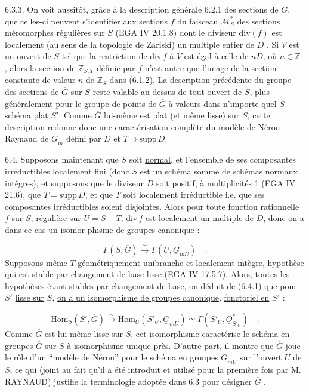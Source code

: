 6.3.3.  On voit aussitôt, grâce à la description générale 6.2.1 des sections de $\overline{G}$, que celles-ci peuvent s'identifier aux sections $f$ du faisceau $\mathcal{M}^*_S$ des sections méromorphes régulières sur $S$ (EGA IV 20.1.8) dont le diviseur $\mathrm{div}(f)$ est localement (au sens de la topologie de Zariski) un multiple entier de $D$ . Si $V$ est un ouvert de $S$ tel que la restriction de $\mathrm{div}\, f$ à $V$ est égal à celle de $nD$, où $n \in \mathbb{Z}$ , alors la section de $\mathbb{Z}_{S,T}$ définie par $f$ n'est autre que l'image de la section constante de valeur $n$ de $\mathbb{Z}_S$ dans (6.1.2). La description précédente du groupe des sections de $\overline{G}$ sur $S$ reste valable au-dessus de tout ouvert de $S$, plus généralement pour le groupe de points de $\overline{G}$ à valeurs dans n'importe quel $S$-schéma plat $S'$. Comme $\overline{G}$ lui-même est plat (et même lisse) sur $S$, cette description redonne donc une caractérisation complète du modèle de Néron-Raynaud de $\underline{G}_m$ défini par $D$ et $T \supset \mathrm{supp}\, D$.

6.4.  Supposons maintenant que $S$ soit \underline{normal}, et l'ensemble de ses composantes irréductibles localement fini (donc $S$ est un schéma somme de schémas normaux intègres), et supposons que le diviseur $D$ soit positif, à multiplicités 1 (EGA IV 21.6), que $T=\mathrm{supp}\, D$, et que $T$ soit localement irréductible i.e. que ses composantes irréductibles soient disjointes. Alors pour toute fonction rationnelle $f$ sur $S$, régulière sur $U = S-T$, $\mathrm{div}\, f$ est localement un multiple de $D$, donc on a dans ce cas un isomor
phisme de groupes canonique :

\begin{equation}\tag{6.4.1}
\Gamma(S,\overline{G}) \overset{\sim}{\longrightarrow} \Gamma(U,\underline{G}_{mU}) \quad .
\end{equation}
Supposons même $T$ géométriquement unibranche et localement intègre, hypothèse qui est stable par changement de base lisse (EGA IV 17.5.7). Alors, toutes les hypothèses étant stables par changement de base, on déduit de (6.4.1) que \underline{pour} $S'$ \underline{lisse sur} $S$, \underline{on a un isomorphisme de groupes canonique}, \underline{fonctoriel en} $S'$ :

\begin{equation}\tag{6.4.2}
\mathrm{Hom}_S(S', \overline{G}) \overset{\sim}{\longrightarrow} \mathrm{Hom}_U(S'_U, \underline{G}_{mU}) \simeq \Gamma(S'_U , \underline{O}^*_{S'_U}) \quad .
\end{equation}
Comme $\overline{G}$ est lui-même lisse sur $S$, cet isomorphisme caractérise le schéma en groupes $\overline{G}$ sur $S$ à isomorphisme unique près. D'autre part, il montre que $\overline{G}$ joue le rôle d'un ``modèle de Néron'' pour le schéma en groupes $\underline{G}_{mU}$ sur l'ouvert $U$ de $S$, ce qui (joint au fait qu'il a été introduit et utilisé pour la première fois par M. RAYNAUD) justifie la terminologie adoptée dans 6.3 pour désigner $\overline{G}$ .

